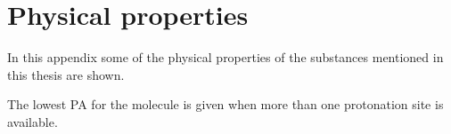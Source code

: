 \chapter{Physical properties}


In this appendix some of the physical properties of the substances mentioned in this thesis are shown.






The lowest PA for the molecule is given when more than one protonation site is available.














